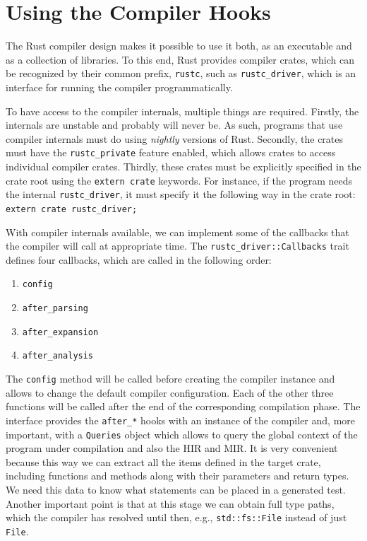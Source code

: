 \documentclass[paper=a4,%
  twoside,%
  BCOR4mm,%
  abstract=true,%
  toc=bibliography,%
  chapterprefix=true,%
  toc=bibliographynumbered,%
  open=right,%
  english,%
  pagesize=pdftex]{scrreprt}
\begin{document}
\section{Using the Compiler Hooks}
The Rust compiler design makes it possible to use it both, as an executable and as a collection of libraries. To this end, Rust provides compiler crates, which can be recognized by their common prefix, \lstinline{rustc}, such as \lstinline{rustc_driver}, which is an interface for running the compiler programmatically.

To have access to the compiler internals, multiple things are required. Firstly, the internals are unstable and probably will never be. As such, programs that use compiler internals must do using \textit{nightly} versions of Rust. Secondly, the crates must have the \lstinline{rustc_private} feature enabled, which allows crates to access individual compiler crates. Thirdly, these crates must be explicitly specified in the crate root using the \lstinline{extern crate} keywords. For instance, if the program needs the internal \lstinline{rustc_driver}, it must specify it the following way in the crate root: \lstinline{extern crate rustc_driver;}

With compiler internals available, we can implement some of the callbacks that the compiler will call at appropriate time. The \lstinline{rustc_driver::Callbacks} trait defines four callbacks, which are called in the following order:
\begin{enumerate}
    \item \lstinline{config}
    \item \lstinline{after_parsing}
    \item \lstinline{after_expansion}
    \item \lstinline{after_analysis}
\end{enumerate}

The \lstinline{config} method will be called before creating the compiler instance and allows to change the default compiler configuration. Each of the other three functions will be called after the end of the corresponding compilation phase. The interface provides the \lstinline{after_*} hooks with an instance of the compiler and, more important, with a \lstinline{Queries} object which allows to query the global context of the program under compilation and also the \ac{HIR} and \ac{MIR}. It is very convenient because this way we can extract all the items defined in the target crate, including functions and methods along with their parameters and return types. We need this data to know what statements can be placed in a generated test. Another important point is that at this stage we can obtain full type paths, which the compiler has resolved until then, e.g., \lstinline{std::fs::File} instead of just \lstinline{File}.
\end{document}

